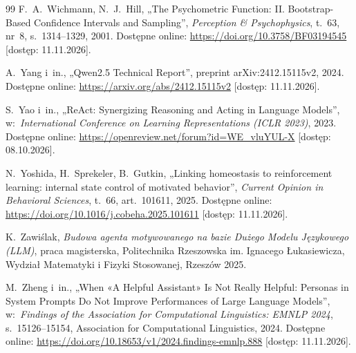 \begin{thebibliography}{99}
 F.~A.~Wichmann, N.~J.~Hill, „The Psychometric Function: {II}. {Bootstrap}-Based Confidence Intervals and Sampling”, \textit{Perception \& Psychophysics}, t.~63, nr~8, s.~1314--1329, 2001. Dostępne online: \url{https://doi.org/10.3758/BF03194545} [dostęp: 11.11.2026].

 A.~Yang i~in., „{Qwen2.5} Technical Report”, preprint arXiv:2412.15115v2, 2024. Dostępne online: \url{https://arxiv.org/abs/2412.15115v2} [dostęp: 11.11.2026].

 S.~Yao i~in., „{ReAct}: Synergizing Reasoning and Acting in Language Models”, w:~\textit{International Conference on Learning Representations (ICLR 2023)}, 2023. Dostępne online: \url{https://openreview.net/forum?id=WE_vluYUL-X} [dostęp: 08.10.2026].

 N.~Yoshida, H.~Sprekeler, B.~Gutkin, „Linking homeostasis to reinforcement learning: internal state control of motivated behavior”, \textit{Current Opinion in Behavioral Sciences}, t.~66, art.~101611, 2025. Dostępne online: \url{https://doi.org/10.1016/j.cobeha.2025.101611} [dostęp: 11.11.2026].

 K.~Zawiślak, \textit{Budowa agenta motywowanego na bazie Dużego Modelu Językowego ({LLM})}, praca magisterska, Politechnika Rzeszowska im. Ignacego Łukasiewicza, Wydział Matematyki i Fizyki Stosowanej, Rzeszów 2025.

 M.~Zheng i~in., „When «{A} Helpful Assistant» Is Not Really Helpful: Personas in System Prompts Do Not Improve Performances of Large Language Models”, w:~\textit{Findings of the Association for Computational Linguistics: EMNLP 2024}, s.~15126--15154, Association for Computational Linguistics, 2024. Dostępne online: \url{https://doi.org/10.18653/v1/2024.findings-emnlp.888} [dostęp: 11.11.2026].

\end{thebibliography}
